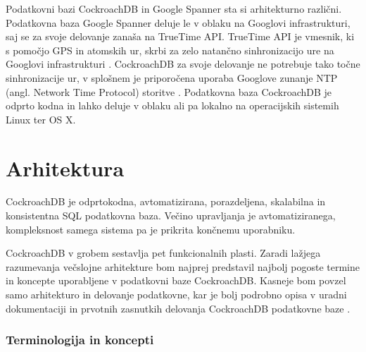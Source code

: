 \documentclass[a4paper, 12pt]{book}
\begin{document}
Podatkovni bazi CockroachDB in Google Spanner sta si arhitekturno različni. Podatkovna baza Google Spanner deluje le v oblaku na Googlovi infrastrukturi, saj se za svoje delovanje zanaša na TrueTime API. TrueTime API je vmesnik, ki s pomočjo GPS in atomskih ur, skrbi za zelo natančno sinhronizacijo ure na Googlovi infrastrukturi \cite{Corbett:2013:SGG:2518037.2491245}. CockroachDB za svoje delovanje ne potrebuje tako točne sinhronizacije ur, v splošnem je priporočena uporaba Googlove zunanje NTP (angl. Network Time Protocol) storitve \cite{CRDB-ntpd-configuration}. Podatkovna baza CockroachDB je odprto kodna in lahko deluje v oblaku ali pa lokalno na operacijskih sistemih Linux ter OS X.

\section{Arhitektura}

CockroachDB je odprtokodna, avtomatizirana, porazdeljena, skalabilna in konsistentna SQL podatkovna baza. Večino upravljanja je avtomatiziranega, kompleksnost samega sistema pa je prikrita končnemu uporabniku. 

CockroachDB v grobem sestavlja pet funkcionalnih plasti. Zaradi lažjega razumevanja večslojne arhitekture bom najprej predstavil najbolj pogoste termine in koncepte uporabljene v podatkovni baze CockroachDB. Kasneje bom povzel samo arhitekturo in delovanje podatkovne, kar je bolj podrobno opisa v uradni dokumentaciji \cite{CRDB-home} in prvotnih zasnutkih delovanja CockroachDB podatkovne baze \cite{CRDB-design}.

\subsubsection{Terminologija in koncepti}
\end{document}
